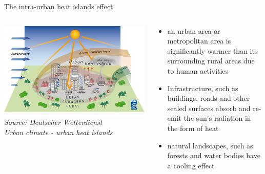 \begin{frame}{The intra-urban heat islands effect}
	\begin{columns}[T] %
		\begin{column}{.52\textwidth}
			\includegraphics[width=\linewidth]{../writeup/images/urbanheatisland_01.png}\\
			\textit{\footnotesize Source: Deutscher Wetterdienst\\Urban climate - urban heat islands}
		\end{column}%
		\hfill%
		\begin{column}{.48\textwidth}
			\begin{itemize}
				\item \glqq{}{[\textellipsis]} an urban area or metropolitan area is significantly warmer than its surrounding rural areas due to human activities\grqq{}\cite{takebayashi_chapter_2020}
				\item Infrastructure, such as buildings, roads and other sealed surfaces absorb and re-emit the sun's radiation in the form of heat
				\item natural landscapes, such as forests and water bodies have a cooling effect\cite{us_epa_learn_2014}
			\end{itemize}
		\end{column}%
	\end{columns}
\end{frame}
